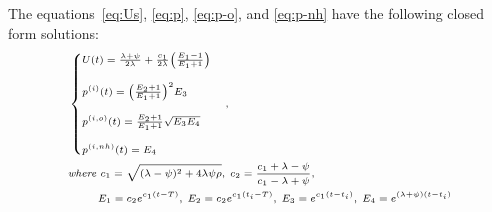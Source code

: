 \documentclass[a4paper,10pt]{article}
\begin{document}
The equations~\ref{eq:Us}, \ref{eq:p}, \ref{eq:p-o}, and \ref{eq:p-nh} have the following closed form solutions:
\begin{equation}
\scriptsize
\begin{split}
&\begin{cases}
U(t) = \frac{\lambda + \psi}{2\lambda} +  \frac{c_1}{2\lambda}\Big(\frac{E_1 - 1}{E_1 + 1}\Big)\\
\\
p^{(i)}(t) = \Big(\frac{E_2 + 1}{E_1 + 1}\Big)^2E_3 \\
\\
p^{(i,o)}(t) =  \frac{E_2 + 1}{E_1 + 1}\sqrt{E_3E_4} \\
\\
p^{(i,nh)}(t) =  E_4
\end{cases},\\
& \textit{where } c_1 = \sqrt{(\lambda - \psi)^2 + 4 \lambda\psi\rho},\; c_2 = \frac{c_1 + \lambda - \psi}{c_1 - \lambda + \psi},\\
& ~~~~~~~~E_1 = c_2 e^{c_1 (t -T)},\; E_2 = c_2 e^{c_1 (t_i -T)},\; E_3 = e^{c_1 (t -t_i)}, \; E_4 =  e^{(\lambda + \psi) (t -t_i)}\\
\end{split}\label{eq:ps}
\end{equation}


%
%
\end{document}
